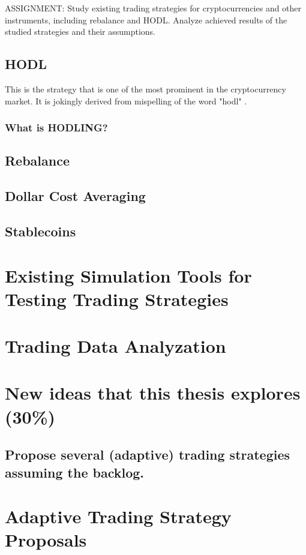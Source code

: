 ASSIGNMENT: Study existing trading strategies for cryptocurrencies and other instruments, including rebalance and HODL. Analyze achieved results of the studied strategies and their assumptions.

\section{HODL}

This is the strategy that is one of the most prominent in the cryptocurrency market.
It is jokingly derived from mispelling of the word "hodl" \cite{investopedia-hodl}.

\subsection*{What is HODLING?}


\section{Rebalance}

\section{Dollar Cost Averaging}

\section{Stablecoins}

\chapter{Existing Simulation Tools for Testing Trading Strategies}

\chapter{Trading Data Analyzation}
\label{data-analyzation}

\chapter{New ideas that this thesis explores (30\%)}
\section{Propose several (adaptive) trading strategies assuming the backlog.}

\chapter{Adaptive Trading Strategy Proposals}
\label{proposal}

